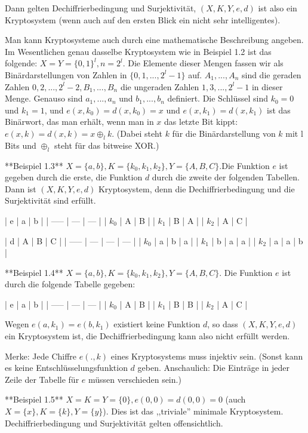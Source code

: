 \documentclass[a4paper]{article}
\begin{document}
\begin{multicols}{3}
    Dann gelten Dechiffrierbedingung und Surjektivität, $(X,K,Y,e,d)$ ist also ein Kryptosystem (wenn auch auf den ersten Blick ein nicht sehr intelligentes).

    Man kann Kryptosysteme auch durch eine mathematische Beschreibung angeben. Im Wesentlichen genau dasselbe Kryptosystem wie in Beispiel 1.2 ist das folgende: $X=Y=\{0,1\}^l,n=2^l$. Die Elemente dieser Mengen fassen wir als Binärdarstellungen von Zahlen in $\{0, 1,..., 2^l-1\}$ auf. $A_1,...,A_n$ sind die geraden Zahlen $0,2,...,2^l-2,B_1,...,B_n$ die ungeraden Zahlen $1,3,...,2^l- 1$ in dieser Menge.
    Genauso sind $a_1,...,a_n$ und $b_1,...,b_n$ definiert. Die Schlüssel sind $k_0=0$ und $k_1=1$, und $e(x,k_0)=d(x,k_0)=x$ und $e(x,k_1)=d(x,k_1)$ ist das Binärwort, das man erhält, wenn man in $x$ das letzte Bit kippt: $e(x,k) =d(x,k) =x\oplus_l k$.
    (Dabei steht $k$ für die Binärdarstellung von $k$ mit l Bits und $\oplus_l$ steht für das bitweise XOR.)

    **Beispiel 1.3** $X=\{a,b\},K=\{k_0,k_1,k_2\},Y=\{A,B,C\}$.Die Funktion $e$ ist gegeben durch die erste, die Funktion $d$ durch die zweite der folgenden Tabellen. Dann ist $(X,K,Y,e,d)$ Kryptosystem, denn die Dechiffrierbedingung und die Surjektivität sind erfüllt.

    | e     | a   | b   |
    | ----- | --- | --- |
    | $k_0$ | A   | B   |
    | $k_1$ | B   | A   |
    | $k_2$ | A   | C   |

    | d     | A   | B   | C   |
    | ----- | --- | --- | --- |
    | $k_0$ | a   | b   | a   |
    | $k_1$ | b   | a   | a   |
    | $k_2$ | a   | a   | b   |

    **Beispiel 1.4** $X=\{a,b\},K=\{k_0,k_1,k_2\},Y=\{A,B,C\}$. Die Funktion $e$ ist durch die folgende Tabelle gegeben:

    | e     | a   | b   |
    | ----- | --- | --- |
    | $k_0$ | A   | B   |
    | $k_1$ | B   | B   |
    | $k_2$ | A   | C   |

    Wegen $e(a,k_1)=e(b,k_1)$ existiert keine Funktion $d$, so dass $(X,K,Y,e,d)$ ein Kryptosystem ist, die Dechiffrierbedingung kann also nicht erfüllt werden.

    Merke: Jede Chiffre $e(.,k)$ eines Kryptosystems muss injektiv sein. (Sonst kann es keine Entschlüsselungsfunktion $d$ geben. Anschaulich: Die Einträge in jeder Zeile der Tabelle für $e$ müssen verschieden sein.)

    **Beispiel 1.5** $X=K=Y=\{0\},e(0,0)=d(0,0)=0$ (auch $X=\{x\},K=\{k\},Y=\{y\}$). Dies ist das ,,triviale'' minimale Kryptosystem. Dechiffrierbedingung und Surjektivität gelten offensichtlich.


\end{multicols}
\end{document}
